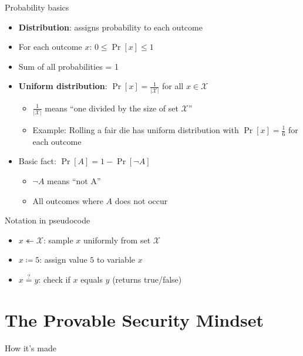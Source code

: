 \documentclass[aspectratio=169, lualatex, handout]{beamer}
\begin{document}
\begin{frame}{Probability basics}
	\begin{itemize}[<+->]
		\item \textbf{Distribution}: assigns probability to each outcome
		\item For each outcome $x$: $0 \leq \Pr[x] \leq 1$
		\item Sum of all probabilities = 1
		\item \textbf{Uniform distribution}: $\Pr[x] = \frac{1}{|\mathcal{X}|}$ for all $x \in \mathcal{X}$
		      \begin{itemize}
			      \item $\frac{1}{|\mathcal{X}|}$ means ``one divided by the size of set $\mathcal{X}$''
			      \item Example: Rolling a fair die has uniform distribution with $\Pr[x] = \frac{1}{6}$ for each outcome
		      \end{itemize}
		\item Basic fact: $\Pr[A] = 1 - \Pr[\neg A]$
		      \begin{itemize}
			      \item $\neg A$ means ``not A''
			      \item All outcomes where $A$ does not occur
		      \end{itemize}
	\end{itemize}
\end{frame}

\begin{frame}{Notation in pseudocode}
	\begin{itemize}[<+->]
		\item $x \twoheadleftarrow \mathcal{X}$: sample $x$ uniformly from set $\mathcal{X}$
		\item $x \coloneq 5$: assign value $5$ to variable $x$
		\item $x \stackrel{?}{=} y$: check if $x$ equals $y$ (returns true/false)
	\end{itemize}
\end{frame}

\section{The Provable Security Mindset}

\begin{frame}{How it's made}
\end{frame}
\end{document}

